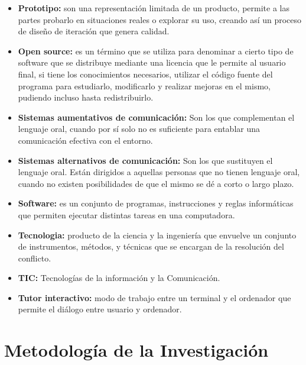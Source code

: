 \documentclass[12pt]{report}%
\begin{document}
\begin{itemize}
\item \textbf{Prototipo:} son una representación limitada de un producto, permite a las partes probarlo en situaciones reales o explorar su uso, creando así un proceso de diseño de iteración que genera calidad.

\item \textbf{Open source:} es un término que se utiliza para denominar a cierto tipo de software que se distribuye mediante una licencia que le permite al usuario final, si tiene los conocimientos necesarios, utilizar el código fuente del programa para estudiarlo,  modificarlo y realizar mejoras en el mismo, pudiendo incluso hasta redistribuirlo.

\item \textbf{Sistemas aumentativos de comunicación:} Son los que complementan el lenguaje oral, cuando por sí solo no es suficiente para entablar una comunicación efectiva con el entorno. 

\item \textbf{Sistemas alternativos de comunicación:} Son los que sustituyen el lenguaje oral. Están dirigidos a aquellas personas que no tienen lenguaje oral, cuando no existen posibilidades de que el mismo se dé a corto o largo plazo.

\item \textbf{Software:} es un conjunto de programas, instrucciones y reglas informáticas que permiten ejecutar distintas tareas en una computadora.

\item \textbf{Tecnologia:} producto de la ciencia y la ingeniería que envuelve un conjunto de instrumentos, métodos, y técnicas que se encargan de la resolución del conflicto.

\item \textbf{TIC:} Tecnologías de la información y la Comunicación.

\item \textbf{Tutor interactivo:} modo de trabajo entre un terminal y el ordenador que permite el diálogo entre usuario y ordenador.

\end{itemize}






\newpage
\chapter{Metodología de la Investigación}
\newpage
\end{document}
